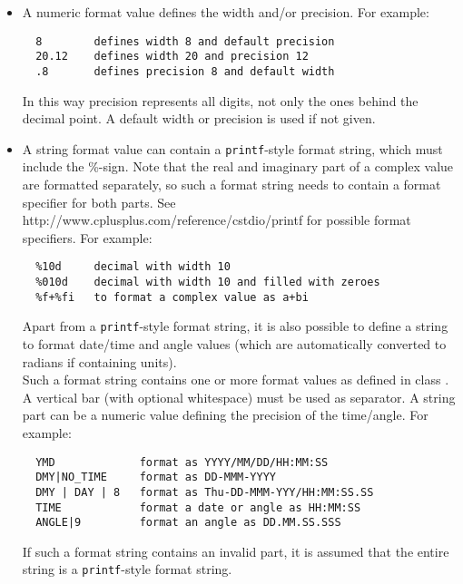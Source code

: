 \begin{itemize}
\item A numeric format value defines the width and/or precision. For example:
\begin{verbatim}
  8        defines width 8 and default precision
  20.12    defines width 20 and precision 12
  .8       defines precision 8 and default width
\end{verbatim}
In this way precision represents all digits, not only the ones behind
the decimal point. A default width or precision is used if not given.
\item A string format value can contain a \texttt{printf}-style format
  string, which must include the \%-sign.
  Note that the real and imaginary part of a complex value are
  formatted separately, so such a format string needs to contain a
  format specifier for
  both parts. See 
  {http://www.cplusplus.com/reference/cstdio/printf} for possible
  format specifiers.
  For example:
\begin{verbatim}
  %10d     decimal with width 10
  %010d    decimal with width 10 and filled with zeroes
  %f+%fi   to format a complex value as a+bi
\end{verbatim}
  Apart from a \texttt{printf}-style format string, it is also possible
  to define a string to format date/time and angle values (which are
  automatically converted to radians if containing units).
  \\Such a format string contains one or more format values as defined in
  class .
  A vertical bar (with optional whitespace) must be used as separator.
  A string part can be a numeric value defining the precision of the time/angle.
  For example:
\begin{verbatim}
  YMD             format as YYYY/MM/DD/HH:MM:SS
  DMY|NO_TIME     format as DD-MMM-YYYY
  DMY | DAY | 8   format as Thu-DD-MMM-YYY/HH:MM:SS.SS
  TIME            format a date or angle as HH:MM:SS
  ANGLE|9         format an angle as DD.MM.SS.SSS
\end{verbatim}
If such a format string contains an invalid part, it is assumed that
the entire string is a \texttt{printf}-style format string.
\end{itemize}

